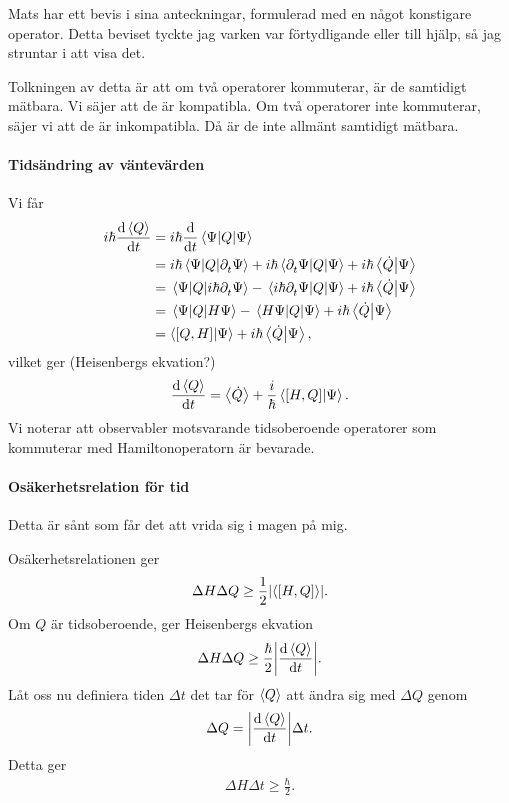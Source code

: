 Mats har ett bevis i sina anteckningar, formulerad med en något konstigare operator. Detta beviset tyckte jag varken var förtydligande eller till hjälp, så jag struntar i att visa det.

Tolkningen av detta är att om två operatorer kommuterar, är de samtidigt mätbara. Vi säjer att de är kompatibla. Om två operatorer inte kommuterar, säjer vi att de är inkompatibla. Då är de inte allmänt samtidigt mätbara.

\paragraph{Tidsändring av väntevärden}
Vi får
\begin{align*}
	i\hbar\dv{\expval{Q}}{t} &= i\hbar\dv{t}\expval{Q}{\Psi} \\
	                         &= i\hbar\mel{\Psi}{Q}{\partial_{t}^{}\Psi} + i\hbar\mel{\partial_{t}^{}\Psi}{Q}{\Psi} + i\hbar\braket{\dot{Q}}{\Psi} \\
	                         &= \mel{\Psi}{Q}{i\hbar\partial_{t}^{}\Psi} - \mel{i\hbar\partial_{t}^{}\Psi}{Q}{\Psi} + i\hbar\braket{\dot{Q}}{\Psi} \\
	                         &= \mel{\Psi}{Q}{H\Psi} - \mel{H\Psi}{Q}{\Psi} + i\hbar\braket{\dot{Q}}{\Psi} \\
	                         &= \braket{[Q, H]}{\Psi} + i\hbar\braket{\dot{Q}}{\Psi},
\end{align*}
vilket ger (Heisenbergs ekvation?)
\begin{align*}
	\dv{\expval{Q}}{t} = \expval{\dot{Q}} + \frac{i}{\hbar}\braket{[H, Q]}{\Psi}.
\end{align*}
Vi noterar att observabler motsvarande tidsoberoende operatorer som kommuterar med Hamiltonoperatorn är bevarade.

\paragraph{Osäkerhetsrelation för tid}
Detta är sånt som får det att vrida sig i magen på mig.

Osäkerhetsrelationen ger
\begin{align*}
	\Delta H\Delta Q\geq\frac{1}{2}\abs{\expval{[H, Q]}}.
\end{align*}
Om $Q$ är tidsoberoende, ger Heisenbergs ekvation
\begin{align*}
	\Delta H\Delta Q\geq\frac{\hbar}{2}\abs{\dv{\expval{Q}}{t}}.
\end{align*}
Låt oss nu definiera tiden $\Delta t$ det tar för $\expval{Q}$ att ändra sig med $\Delta Q$ genom
\begin{align*}
	\Delta Q = \abs{\dv{\expval{Q}}{t}}\Delta t.
\end{align*}
Detta ger
\begin{align*}
	\Delta H\Delta t\geq\frac{\hbar}{2}.
\end{align*}

